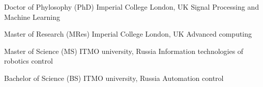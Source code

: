 \documentclass[10pt, a4paper]{article}
\begin{document}
{\begin{minipage}[c][0.95\textheight][t]{0.69\linewidth}
					{Doctor of Phylosophy (PhD)}
					{Imperial College London, UK}
					{Signal Processing and Machine Learning}
					{\lorem}

					{Master of Research (MRes)}
					{Imperial College London, UK}
					{Advanced computing}
					{\lorem}

					{Master of Science (MS)}
					{ITMO university, Russia}
					{Information technologies of robotics control}
					{\lorem}

					{Bachelor of Science (BS)}
					{ITMO university, Russia}
					{Automation control}
					{\lorem}

	\end{minipage}
}
%
%
%
%
%
%
\end{document}
